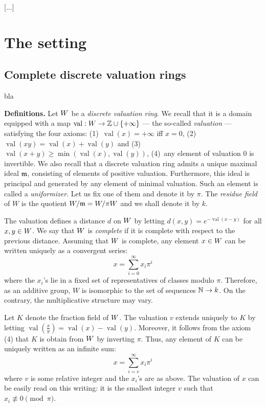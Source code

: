\documentclass{sig-alternate}
\DeclareMathOperator{\val}{val}
\begin{document}
\medskip

[...]

\section{The setting}

\subsection{Complete discrete valuation rings}

bla

\medskip

\noindent
\textbf{Definitions.}
Let $W$ be a \emph{discrete valuation ring}. We recall that it is a 
domain equipped with a map $\val : \A \to \Z \cup \{+\infty\}$ --- the 
so-called \emph{valuation} --- satisfying the four axioms: (1)~$\val(x) = 
+\infty$ iff $x = 0$, (2)~$\val(xy) = \val(x) + \val(y)$ and (3)~$\val(x+y) \geq 
\min(\val(x), \val(y))$, (4)~any element of valuation $0$ is invertible.
We also recall that a discrete valuation ring admits a unique maximal 
ideal $\mathfrak m$, consisting of elements of positive valuation. 
Furthermore, this ideal is principal and generated by any element of 
minimal valuation. Such an element is called a \emph{uniformizer}.
Let us fix one of them and denote it by $\pi$. The \emph{residue
field} of $W$ is the quotient $W/\mathfrak m = W/\pi W$ and we shall denote
it by $k$.

The valuation defines a distance $d$ on $W$ by letting $d(x,y) = 
e^{-\val(x-y)}$ for all $x, y \in W$. We say that $W$ is \emph{complete}
if it is complete with respect to the previous distance. Assuming that
$W$ is complete, any element $x \in W$ can be written uniquely as a 
convergent series:
\begin{equation}
\label{eq:expandCDVR}
x = \sum_{i=0}^\infty x_i \pi^i
\end{equation}
where the $x_i$'s lie in a fixed set of representatives of classes
modulo $\pi$. Therefore, as an additive group, $W$ is isomorphic to 
the set of sequences $\mathbb N \to k$. On the contrary, the multiplicative
structure may vary.

Let $K$ denote the fraction field of $W$. The valuation $v$ extends 
uniquely to $K$ by letting $\val(\frac x y) = \val(x) - \val(y)$. 
Moreover, it follows from the axiom (4) that $K$ is obtain from $W$ by 
inverting $\pi$. Thus, any element of $K$ can be uniquely written as an 
infinite sum:
\begin{equation}
\label{eq:expandCDVF}
x = \sum_{i=v}^\infty x_i \pi^i
\end{equation}
where $v$ is some relative integer and the $x_i$'s are as above. The
valuation of $x$ can be easily read on this writing: it is the smallest 
integer $v$ such that $x_i \not\equiv 0 \pmod \pi$.
\end{document}
